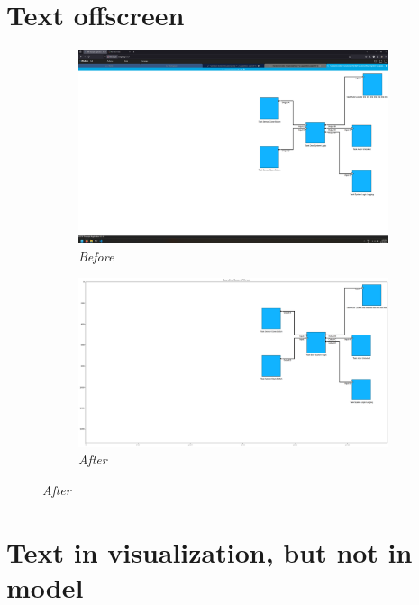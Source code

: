 \documentclass{article}
\begin{document}
\section{Text offscreen}
\begin{figure}[H]
    \centering
    \begin{subfigure}[t]{0.9\textwidth}
        \centering
        \includegraphics[width=\textwidth]{testcases/text_offscreen/160531-259368_input_image.png}
        \caption*{\textit{Before}}
    \end{subfigure}
    \newline
    \begin{subfigure}[t]{0.9\textwidth}
        \centering
        \includegraphics[width=\textwidth]{testcases/text_offscreen/160551-417948_element_bbox_errors_labeled_colored.png}
        \caption*{\textit{After}}
    \end{subfigure}
    \label{fig:text_offscreen}
\end{figure}
\newpage

\section{Text in visualization, but not in model}
\end{document}
